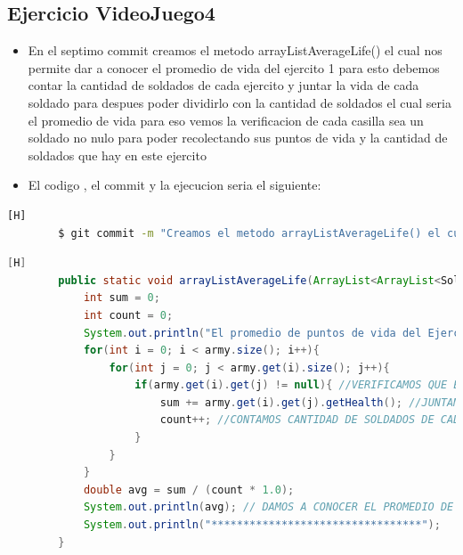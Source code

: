 \documentclass{article}
\begin{document}
	\subsection{Ejercicio VideoJuego4}
	\begin{itemize}	
		\item En el septimo commit creamos el metodo arrayListAverageLife() el cual nos permite dar a conocer el promedio de vida del ejercito 1 para esto debemos contar la cantidad de soldados de cada ejercito y juntar la vida de cada soldado para despues poder dividirlo con la cantidad de soldados el cual seria el promedio de vida para eso vemos la verificacion de cada casilla sea un soldado no nulo para poder recolectando sus puntos de vida y la cantidad de soldados que hay en este ejercito
		\item El codigo , el commit y la ejecucion seria el siguiente:
	\end{itemize}	
	\begin{lstlisting}[language=bash,caption={Commit}][H]
		$ git commit -m "Creamos el metodo arrayListAverageLife() el cual nos permite dar a conocer el promedio de vida del ejercito 1 para esto debemos contar la cantidad de soldados de cada ejercito y juntar la vida de cada soldado para despues poder dividirlo con la cantidad de soldados el cual seria el promedio de vida para eso vemos la verificacion de cada casilla sea un soldado no nulo para poder recolectando sus puntos de vida y la cantidad de soldados que hay en el ejercito 1 el cual los vamos contando dependiendo de cuantos existan debido a una comprobacion"
	\end{lstlisting}	
	\begin{lstlisting}[language=java,caption={Las lineas de codigos del metodo creado:}][H]
		public static void arrayListAverageLife(ArrayList<ArrayList<Soldado>> army, int num){
			int sum = 0;
			int count = 0;
			System.out.println("El promedio de puntos de vida del Ejercito " + num + " es: "); //METODO CREADO QUE NOS PERMITE DAR A CONOCER EL PROMEDIO DE VIDA DE CADA EJERCITO
			for(int i = 0; i < army.size(); i++){
				for(int j = 0; j < army.get(i).size(); j++){
					if(army.get(i).get(j) != null){ //VERIFICAMOS QUE EL SOLDADO DE CADA CASILLA SEA NO NULO 
						sum += army.get(i).get(j).getHealth(); //JUNTAMOS LOS VALORES DE VIDA DE CADA SOLDADO DE CADA EJERCITO 
						count++; //CONTAMOS CANTIDAD DE SOLDADOS DE CADA EJERCITO PARA DESPUES PODER DIVIDIRLO CON LA SUMA DE VIDA DE CADA EJERCITO
					}
				}
			}
			double avg = sum / (count * 1.0);
			System.out.println(avg); // DAMOS A CONOCER EL PROMEDIO DE VIDA DE CADA EJERCITO 
			System.out.println("*********************************");
		}
	\end{lstlisting}
\end{document}

